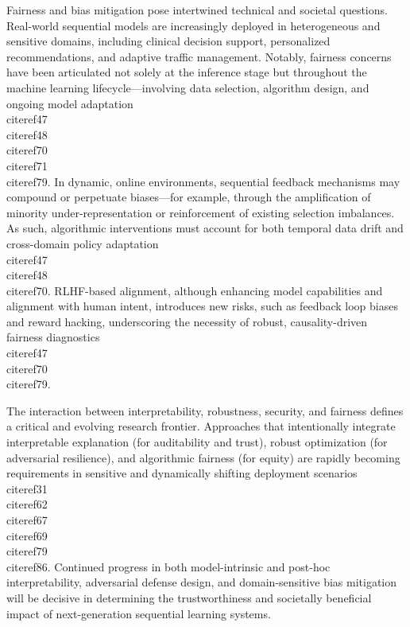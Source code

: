 \documentclass[11pt]{article}
\begin{document}
Fairness and bias mitigation pose intertwined technical and societal questions. Real-world sequential models are increasingly deployed in heterogeneous and sensitive domains, including clinical decision support, personalized recommendations, and adaptive traffic management. Notably, fairness concerns have been articulated not solely at the inference stage but throughout the machine learning lifecycle—involving data selection, algorithm design, and ongoing model adaptation~\\cite{ref47}\\cite{ref48}\\cite{ref70}\\cite{ref71}\\cite{ref79}. In dynamic, online environments, sequential feedback mechanisms may compound or perpetuate biases—for example, through the amplification of minority under-representation or reinforcement of existing selection imbalances. As such, algorithmic interventions must account for both temporal data drift and cross-domain policy adaptation~\\cite{ref47}\\cite{ref48}\\cite{ref70}. RLHF-based alignment, although enhancing model capabilities and alignment with human intent, introduces new risks, such as feedback loop biases and reward hacking, underscoring the necessity of robust, causality-driven fairness diagnostics~\\cite{ref47}\\cite{ref70}\\cite{ref79}.

The interaction between interpretability, robustness, security, and fairness defines a critical and evolving research frontier. Approaches that intentionally integrate interpretable explanation (for auditability and trust), robust optimization (for adversarial resilience), and algorithmic fairness (for equity) are rapidly becoming requirements in sensitive and dynamically shifting deployment scenarios~\\cite{ref31}\\cite{ref62}\\cite{ref67}\\cite{ref69}\\cite{ref79}\\cite{ref86}. Continued progress in both model-intrinsic and post-hoc interpretability, adversarial defense design, and domain-sensitive bias mitigation will be decisive in determining the trustworthiness and societally beneficial impact of next-generation sequential learning systems.
\end{document}
